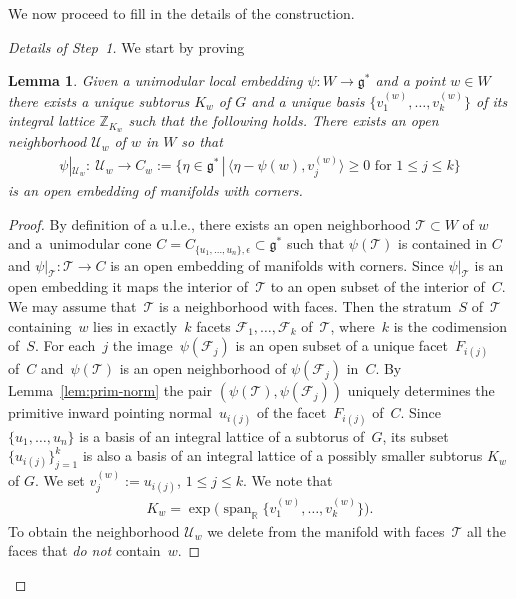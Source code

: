 \documentclass[pdftex]{sigma}
\numberwithin{equation}{section}
\newtheorem{Lemma}{Lemma}[section]
\begin{document}
We now proceed to f\/ill in the details of the construction.
\begin{proof}[Details of Step~1] We start by proving

\begin{Lemma} \label{lemma:step1.1} Given a unimodular local embedding
  $\psi\colon W\to {\mathfrak g}^*$ and a point $w \in W$ there exists a unique subtorus $K_w$
  of $G$ and a unique basis $\{v_1^{(w)},\ldots, v_k^{(w)}\}$ of its integral
  lattice ${\mathbb Z}_{K_w}$ such that the following holds.
There exists an open neighborhood ${\mathcal U}_w$ of $w$ in $W$ so that
\begin{gather*}
\psi|_{{\mathcal U}_w}\colon \ {\mathcal U}_w \to C_w:= \big\{
\eta \in {\mathfrak g}^* \,|\,
\big\langle \eta -\psi (w),  v_j^{(w)}\big\rangle\geq 0 \text{ for } 1\leq j\leq k\big\}
\end{gather*}
is an open embedding of manifolds with corners.
\end{Lemma}

\begin{proof}
By def\/inition of a u.l.e., there exists an open neighborhood ${\mathcal T}
\subset W$ of $w$ and a~uni\-mo\-du\-lar cone $C = C_{\{u_1,\ldots,u_n\},
  \epsilon} \subset {\mathfrak g}^*$ such that $\psi({\mathcal T})$ is contained in $C$ and
$\psi|_{{\mathcal T}} \colon {\mathcal T} \to C$ is an open embedding of manifolds
with corners.  Since $\psi|_{{\mathcal T}}$ is an open embedding it maps the
interior of~${\mathcal T}$ to an open subset of the interior of~$C$.  We may
assume that~${\mathcal T}$ is a neighborhood with faces.  Then the stratum~$S$ of~${\mathcal T}$ containing~$w$ lies in exactly~$k$
facets ${\mathcal F}_1,\ldots, {\mathcal F}_k$ of~${\mathcal T}$, where~$k$ is the
codimension of~$S$.  For each~$j$ the image~$\psi({\mathcal F}_j)$ is an
open subset of a unique facet~$F_{i(j)}$ of~$C$ and~$\psi({\mathcal T})$ is
an open neighborhood of $\psi({\mathcal F}_j)$ in~$C$.
By Lemma~\ref{lem:prim-norm} the pair $(\psi({\mathcal T}), \psi({\mathcal F}_j))$ uniquely
determines the primitive inward pointing normal~$u_{i(j)}$ of the facet~$F_{i(j)}$ of~$C$.  Since $\{u_1,\ldots,u_n\}$ is a basis of an integral
lattice of a subtorus of~$G$, its subset $\{u_{i(j)}\}_{j=1}^k$ is
also a basis of an integral lattice of a possibly smaller subtorus
$K_w$ of $G$. We set $v_j^{(w)}:= u_{i(j)} $, $1\leq j\leq k$.
We  note that
\begin{gather*}
K_w = \exp\big(\operatorname{span}_{\mathbb R} \big\{v_1^{(w)},\ldots, v_k^{(w)}\big\}\big).
\end{gather*}
To obtain the neighborhood ${\mathcal U}_w$ we delete from the manifold with
faces~${\mathcal T}$ all the faces that {\em do not} contain~$w$.
\end{proof}


\end{proof}
\end{document}
